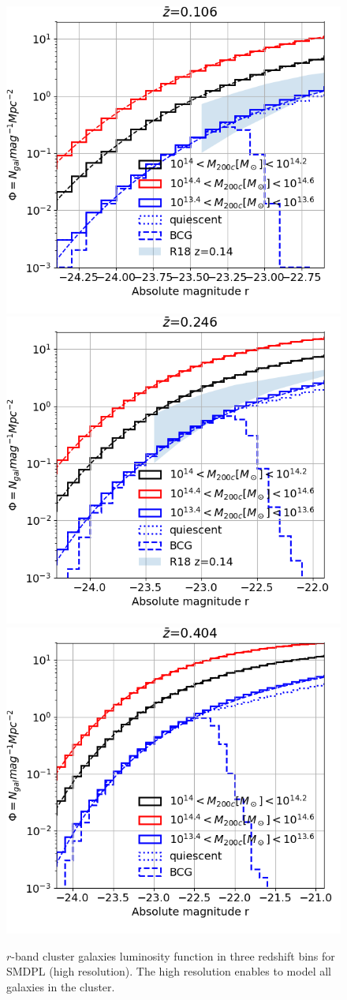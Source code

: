 \documentclass[fleqn,usenatbib,onecolumn]{mnras}
\begin{document}
\begin{figure}
\centering
\includegraphics[width=.6\columnwidth,type=png,ext=.png,read=.png]{figures/MD04_cluster_galaxy_LF_z_090430}
\includegraphics[width=.6\columnwidth,type=png,ext=.png,read=.png]{figures/MD04_cluster_galaxy_LF_z_080230}
\includegraphics[width=.6\columnwidth,type=png,ext=.png,read=.png]{figures/MD04_cluster_galaxy_LF_z_071240}
\caption{\label{fig:optical:LF:MD04}$r$-band cluster galaxies luminosity function in three redshift bins for SMDPL (high resolution). The high resolution enables to model all galaxies in the cluster.}
\end{figure}
\end{document}
